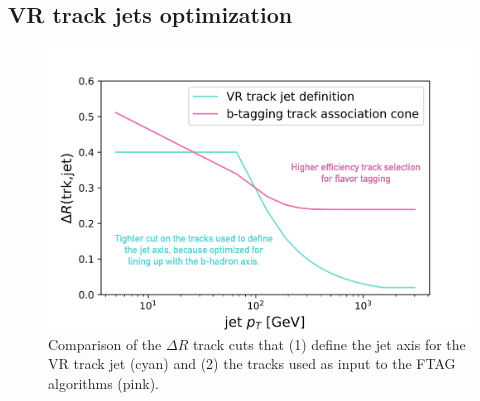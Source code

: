 \begin{figure}[htbp]
    \centering
    \caption{}
    \label{fig:\jetdef-fig1}
\end{figure}

\begin{figure}[htbp]
    \centering
    \caption{}
    \label{fig:\jetdef-fig2}
\end{figure}

\begin{figure}[htbp]
    \centering
    \caption{}
    \label{fig:\jetdef-fig3}
\end{figure}






\FloatBarrier
\clearpage
\subsection{VR track jets optimization}

\begin{figure}[htbp]
  \centering
  \includegraphics[width=.6\textwidth]{figures/ftag/VR trainings/vr-ftag-dR-cuts}
  \caption{Comparison of the $\Delta R$ track cuts that (1) define the jet axis for the VR track jet (cyan) and (2) the tracks used as input to the FTAG algorithms (pink).}
  \label{fig:pt-VR-pflow}
\end{figure}



